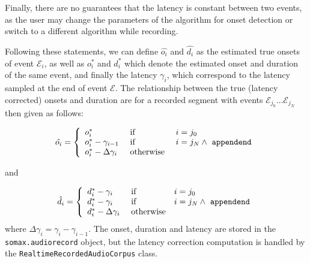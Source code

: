 Finally, there are no guarantees that the latency is constant between two events, as the user may change the parameters of the algorithm for onset detection or switch to a different algorithm while recording.

Following these statements, we can define $\hat{o_i}$ and $\hat{d_i}$ as the estimated true onsets of event $\mathcal E_i$, as well as $o_i^\ast$ and $d_i^\ast$ which denote the estimated onset and duration of the same event, and finally the latency $\gamma_i$, which correspond to the latency sampled at the end of event $\mathcal E$. The relationship between the true (latency corrected) onsets and duration are for a recorded segment with events $\mathcal E_{j_0} \dots \mathcal E_{j_N}$ then given as follows:

\begin{equation}
\hat{o_i} = 
	\left\lbrace\begin{array}{lll}
		o_i^\ast & \text { if } & i = j_0 \\
		o_i^\ast - \gamma_{i-1} & \text{ if } & i = j_N \wedge \text{ \texttt{appendend}} \\
		o_i^\ast - \Delta\gamma_i & \text{ otherwise }
	\end{array}\right.
\end{equation}

and 

\begin{equation}
\hat{d_i} = 
	\left\lbrace\begin{array}{lll}
		d_i^\ast - \gamma_i & \text{ if } & i = j_0 \\
		d_i^\ast - \gamma_i & \text{ if } & i = j_N \wedge \text{ \texttt{appendend}} \\
		d_i^\ast - \Delta\gamma_i & \text{ otherwise}
	\end{array}\right.
\end{equation}
where $\Delta \gamma_i = \gamma_i - \gamma_{i-1}$. The onset, duration and latency are stored in the \texttt{somax.audiorecord} object, but the latency correction computation is handled by the \texttt{RealtimeRecordedAudioCorpus} class.


